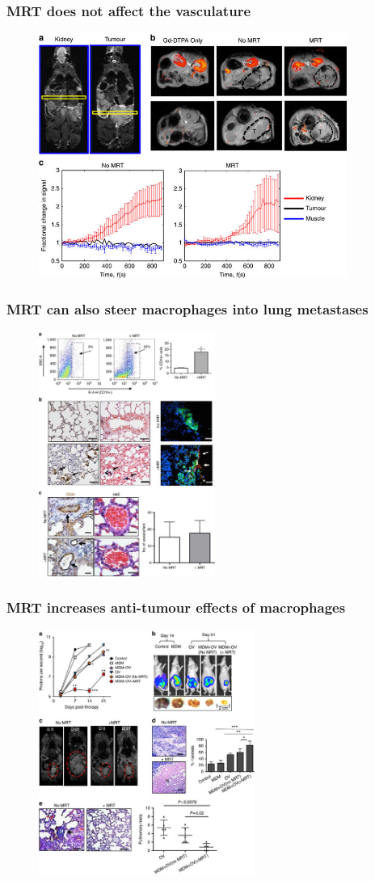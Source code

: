 \documentclass[8pt,xcolor=table]{beamer}
\begin{document}
\begin{frame}
\frametitle{MRT does not affect the vasculature}
 \begin{figure}
 \centering
 \includegraphics[height=8cm]{muthana_fig3_res}
 \end{figure} 
\end{frame}

\begin{frame}
\frametitle{MRT can also steer macrophages into lung metastases}
 \begin{figure}
 \centering
 \includegraphics[height=8cm]{muthana_fig4_res}
 \end{figure} 
\end{frame}

\begin{frame}
\frametitle{MRT increases anti-tumour effects of macrophages}
 \begin{figure}
 \centering
 \includegraphics[height=8cm]{muthana_fig5_res}
 \end{figure} 
\end{frame}
\end{document}
